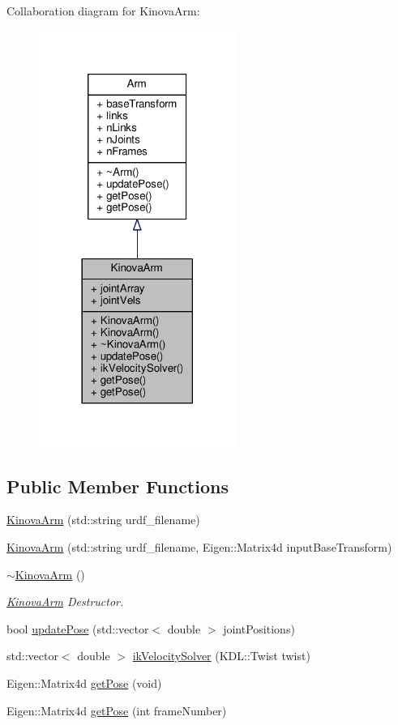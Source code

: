 Collaboration diagram for Kinova\+Arm\+:
\nopagebreak
\begin{figure}[H]
\begin{center}
\leavevmode
\includegraphics[width=182pt]{class_kinova_arm__coll__graph}
\end{center}
\end{figure}
\subsection*{Public Member Functions}
\begin{DoxyCompactItemize}
\item 
\hyperlink{class_kinova_arm_abbbe90c0d43bf6665d62bdf6c1ef398f}{Kinova\+Arm} (std\+::string urdf\+\_\+filename)
\item 
\hyperlink{class_kinova_arm_a5ca50dcf1c211aea4986bc5a04f37331}{Kinova\+Arm} (std\+::string urdf\+\_\+filename, Eigen\+::\+Matrix4d input\+Base\+Transform)
\item 
\hyperlink{class_kinova_arm_a9d5b485d8137a0b27e98a0c1c4d67861}{$\sim$\+Kinova\+Arm} ()
\begin{DoxyCompactList}\small\item\em \hyperlink{class_kinova_arm}{Kinova\+Arm} Destructor. \end{DoxyCompactList}\item 
bool \hyperlink{class_kinova_arm_a3374988c7b3d9ae8773bc63f950629f7}{update\+Pose} (std\+::vector$<$ double $>$ joint\+Positions)
\item 
std\+::vector$<$ double $>$ \hyperlink{class_kinova_arm_a0a5a3bd128b420d58d92d242c075db92}{ik\+Velocity\+Solver} (K\+D\+L\+::\+Twist twist)
\item 
Eigen\+::\+Matrix4d \hyperlink{class_kinova_arm_aea7c01f72eb70387ff71ca130db3bd3f}{get\+Pose} (void)
\item 
Eigen\+::\+Matrix4d \hyperlink{class_kinova_arm_ae6b5c17c1b7b79bc3de00e8d38b80999}{get\+Pose} (int frame\+Number)
\end{DoxyCompactItemize}
